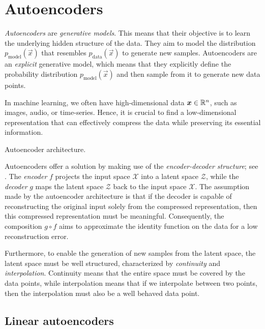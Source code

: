 \section{Autoencoders}

\textit{Autoencoders} \citep{kramer1991nonlinear} are \textit{generative models}. This means that
their objective is to learn the underlying hidden structure of the data. They aim to model the
distribution $p_{\mathrm{model}}(\vec{x})$ that resembles $p_{\mathrm{data}}(\vec{x})$ to generate
new samples. Autoencoders are an \textit{explicit} generative model, which means that they explicitly
define the probability distribution $p_{\mathrm{model}}(\vec{x})$ and then sample from it to generate
new data points.

In machine learning, we often have high-dimensional data $\bm{x} \in \mathbb{R}^n$, such as images, audio,
or time-series. Hence, it is crucial to find a low-dimensional representation that can effectively
compress the data while preserving its essential information.

\begin{marginfigure}
    \centering
    \caption{Autoencoder architecture.}
    \label{fig:autoencoder}
\end{marginfigure}

Autoencoders offer a solution by making use of the \textit{encoder-decoder structure}; see
. The \textit{encoder} $f$ projects the input space $\mathcal{X}$ into a
latent space $\mathcal{Z}$, while the \textit{decoder} $g$ maps the latent space $\mathcal{Z}$ back
to the input space $\mathcal{X}$. The assumption made by the autoencoder architecture is that if
the decoder is capable of reconstructing the original input solely from the compressed
representation, then this compressed representation must be meaningful. Consequently, the
composition $g \circ f$ aims to approximate the identity function on the data for a low
reconstruction error.

Furthermore, to enable the generation of new samples from the latent space, the latent space must
be well structured, characterized by \textit{continuity} and \textit{interpolation}. Continuity
means that the entire space must be covered by the data points, while interpolation means that if
we interpolate between two points, then the interpolation must also be a well behaved data point.

\subsection{Linear autoencoders}

